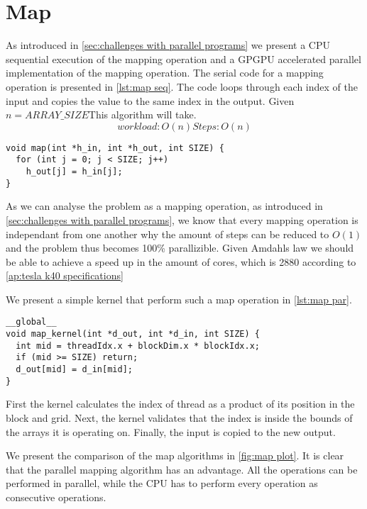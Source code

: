 \section{Map}
\label{sec:map}

As introduced in \cref{sec:challenges with parallel programs} we present a CPU sequential execution of the mapping operation and a GPGPU accelerated parallel implementation of the mapping operation.
The serial code for a mapping operation is presented in \cref{lst:map seq}.
The code loops through each index of the input and copies the value to the same index in the output.
Given $n=ARRAY\_SIZE$This algorithm will take.
\begin{equation*}
workload: O(n)
Steps: O(n)
\end{equation*}

\begin{lstlisting}[caption={Serial map}, label={lst:map seq}]
void map(int *h_in, int *h_out, int SIZE) {
  for (int j = 0; j < SIZE; j++) 
    h_out[j] = h_in[j];
}
\end{lstlisting}

As we can analyse the problem as a mapping operation, as introduced in \cref{sec:challenges with parallel programs}, we know that every mapping operation is independant from one another why the amount of steps can be reduced to $O(1)$ and the problem thus becomes 100\% parallizible.
Given Amdahls law we should be able to achieve a speed up in the amount of cores, which is 2880 according to \cref{ap:tesla k40 specifications}

We present a simple kernel that perform such a map operation in \cref{lst:map par}.

\begin{lstlisting}[caption={Map kernel}, label={lst:map par}]
__global__ 
void map_kernel(int *d_out, int *d_in, int SIZE) {
  int mid = threadIdx.x + blockDim.x * blockIdx.x;
  if (mid >= SIZE) return;
  d_out[mid] = d_in[mid];
}
\end{lstlisting}

First the kernel calculates the index of thread as a product of its position in the block and grid.
Next, the kernel validates that the index is inside the bounds of the arrays it is operating on.
Finally, the input is copied to the new output.

We present the comparison of the map algorithms in \cref{fig:map plot}.
It is clear that the parallel mapping algorithm has an advantage.
All the operations can be performed in parallel, while the CPU has to perform every operation as consecutive operations.

